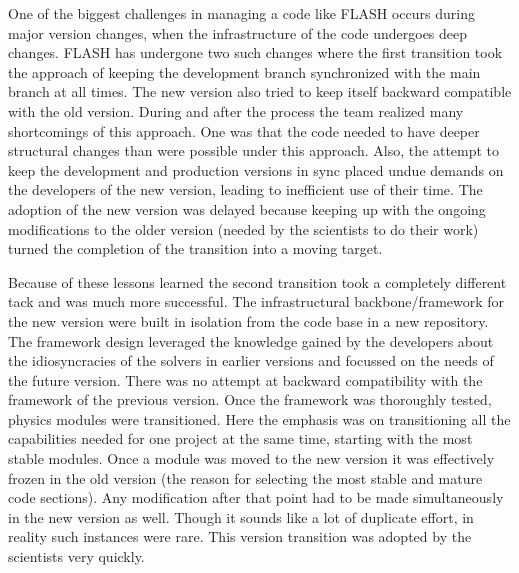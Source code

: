 One of the biggest challenges in managing a code like FLASH occurs
during major version changes, when the infrastructure of the code
undergoes deep changes. FLASH has undergone two such changes where the
first transition took the approach of keeping the development branch
synchronized with the main branch at all times. The new version also
tried to keep itself backward compatible with the old version. During
and after the process the team realized many shortcomings of this
approach. One was that the code needed to have deeper structural
changes than were possible under this approach. Also, the attempt to keep the development and
production versions in sync placed undue demands on the developers of
the new version, leading to inefficient use of their time. The adoption of the new version was delayed
because keeping up with the ongoing modifications to the older version
(needed by the scientists to do their work) turned the completion of
the transition into a moving target. 

Because of these lessons learned the second transition took a
completely different tack and was much more successful. The
infrastructural backbone/framework for the new version were built in
isolation from the code base in a new repository. The framework design
leveraged the knowledge gained by the developers about the
idiosyncracies of the solvers in earlier versions and focussed on
the needs of the future version. There was no attempt at backward
compatibility with the framework of the previous version. Once the
framework was thoroughly tested, physics modules were
transitioned. Here the emphasis was on transitioning all the
capabilities needed for one project at the same time, starting with
the most stable modules. Once a module was moved to the new version it
was effectively frozen in the old version (the reason for selecting
the most stable and mature code sections). Any modification after that
point had to be made simultaneously in the new version as well. Though
it sounds like a lot of duplicate effort, in reality such instances
were rare. This version transition was adopted by the scientists very quickly.

